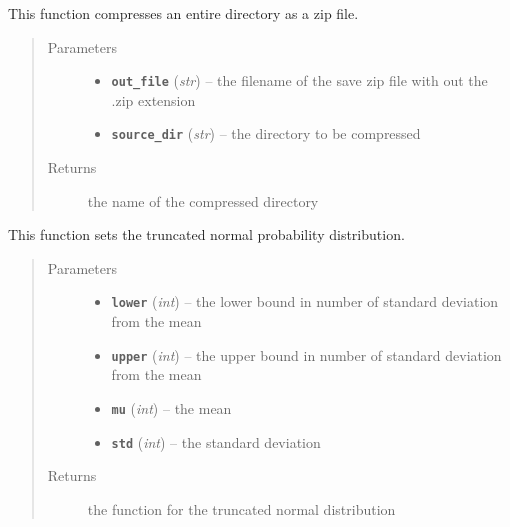 \documentclass[letterpaper,10pt,english]{sphinxmanual}
\begin{document}
\begin{fulllineitems}
\label{my_globals:my_globals.save_zip}
This function compresses an entire directory as a zip file.
\begin{quote}\begin{description}
\item[{Parameters}] \leavevmode\begin{itemize}
\item {} 
\textbf{\texttt{out\_file}} (\emph{str}) -- the filename of the save zip file with out the .zip extension

\item {} 
\textbf{\texttt{source\_dir}} (\emph{str}) -- the directory to be compressed

\end{itemize}

\item[{Returns}] \leavevmode
the name of the compressed directory

\end{description}\end{quote}

\end{fulllineitems}


\begin{fulllineitems}
\label{my_globals:my_globals.set_distribution}
This function sets the truncated normal probability distribution.
\begin{quote}\begin{description}
\item[{Parameters}] \leavevmode\begin{itemize}
\item {} 
\textbf{\texttt{lower}} (\emph{int}) -- the lower bound in number of standard deviation from the mean

\item {} 
\textbf{\texttt{upper}} (\emph{int}) -- the upper bound in number of standard deviation from the mean

\item {} 
\textbf{\texttt{mu}} (\emph{int}) -- the mean

\item {} 
\textbf{\texttt{std}} (\emph{int}) -- the standard deviation

\end{itemize}

\item[{Returns}] \leavevmode
the function for the truncated normal distribution

\end{description}\end{quote}

\end{fulllineitems}
\end{document}
